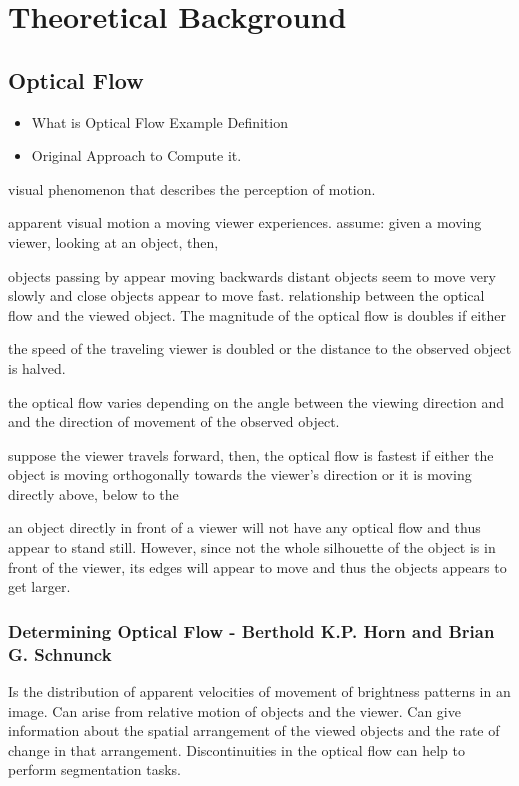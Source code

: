 \chapter{Theoretical Background}

\section{Optical Flow}
\begin{itemize}
  \item What is Optical Flow
  \subitem Example
  \subitem Definition
  \item Original Approach to Compute it.
\end{itemize}


visual phenomenon that describes the perception of motion.

apparent visual motion a moving viewer experiences.
assume: given a moving viewer, looking at an object, then, 

objects passing by appear moving backwards
distant objects seem to move very slowly and close objects appear to move fast.
relationship between the optical flow and the viewed object. The magnitude of the optical flow is doubles if either

the speed of the traveling viewer is doubled or the distance to the observed object is halved.

the optical flow varies depending on the angle between the viewing direction and and the direction of movement of the observed object.

suppose the viewer travels forward, then, the optical flow is fastest if either the object is moving orthogonally towards the viewer's direction or it is moving directly above, below to the 

an object directly in front of a viewer will not have any optical flow and thus appear to stand still. However, since not the whole silhouette of the object is in front of the viewer, its edges will appear to move and thus the objects appears to get larger. 
 

\subsection{Determining Optical Flow - Berthold K.P. Horn and Brian G. Schnunck}

Is the distribution of apparent velocities of movement of brightness patterns in an image.
Can arise from relative motion of objects and the viewer.
Can give information about the spatial arrangement of the viewed objects and the rate of change in that arrangement.
Discontinuities in the optical flow can help to perform segmentation tasks.

